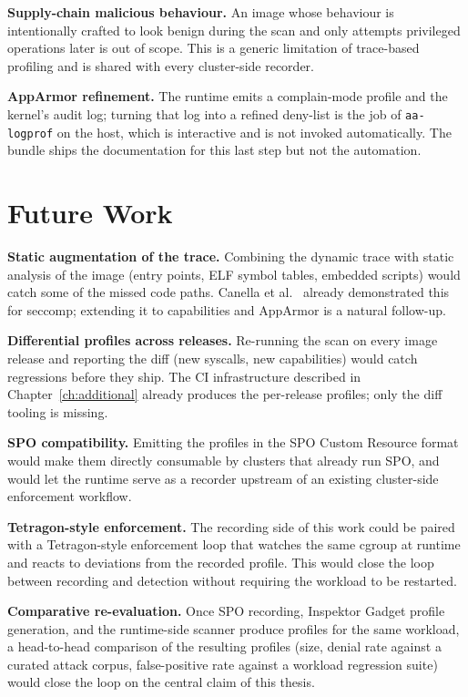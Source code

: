 \textbf{Supply-chain malicious behaviour.} An image whose behaviour is intentionally crafted to look benign during the scan and only attempts privileged operations later is out of scope. This is a generic limitation of trace-based profiling and is shared with every cluster-side recorder.

\textbf{AppArmor refinement.} The runtime emits a complain-mode profile and the kernel's audit log; turning that log into a refined deny-list is the job of \texttt{aa-logprof} on the host, which is interactive and is not invoked automatically. The bundle ships the documentation for this last step but not the automation.

\section{Future Work}

\textbf{Static augmentation of the trace.} Combining the dynamic trace with static analysis of the image (entry points, ELF symbol tables, embedded scripts) would catch some of the missed code paths. Canella et al.~\cite{canella2021} already demonstrated this for seccomp; extending it to capabilities and AppArmor is a natural follow-up.

\textbf{Differential profiles across releases.} Re-running the scan on every image release and reporting the diff (new syscalls, new capabilities) would catch regressions before they ship. The CI infrastructure described in Chapter~\ref{ch:additional} already produces the per-release profiles; only the diff tooling is missing.

\textbf{SPO compatibility.} Emitting the profiles in the SPO Custom Resource format would make them directly consumable by clusters that already run SPO, and would let the runtime serve as a recorder upstream of an existing cluster-side enforcement workflow.

\textbf{Tetragon-style enforcement.} The recording side of this work could be paired with a Tetragon-style enforcement loop that watches the same cgroup at runtime and reacts to deviations from the recorded profile. This would close the loop between recording and detection without requiring the workload to be restarted.

\textbf{Comparative re-evaluation.} Once SPO recording, Inspektor Gadget profile generation, and the runtime-side scanner produce profiles for the same workload, a head-to-head comparison of the resulting profiles (size, denial rate against a curated attack corpus, false-positive rate against a workload regression suite) would close the loop on the central claim of this thesis.

